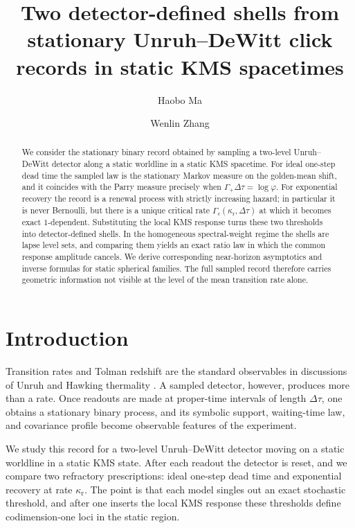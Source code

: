 \documentclass[11pt]{amsart}
\title[Detector-defined shells in static KMS spacetimes]{Two detector-defined shells from stationary Unruh--DeWitt click records in static KMS spacetimes}
\author{Haobo Ma}
\author{Wenlin Zhang}
\date{}
\numberwithin{equation}{section}
\theoremstyle{remark}
\begin{document}
\begin{abstract}
We consider the stationary binary record obtained by sampling a two-level Unruh--DeWitt detector along a static worldline in a static KMS spacetime. For ideal one-step dead time the sampled law is the stationary Markov measure on the golden-mean shift, and it coincides with the Parry measure precisely when $\Gamma_+\Delta\tau=\log\varphi$. For exponential recovery the record is a renewal process with strictly increasing hazard; in particular it is never Bernoulli, but there is a unique critical rate $\Gamma_c(\kappa_{\mathrm r},\Delta\tau)$ at which it becomes exact $1$-dependent. Substituting the local KMS response turns these two thresholds into detector-defined shells. In the homogeneous spectral-weight regime the shells are lapse level sets, and comparing them yields an exact ratio law in which the common response amplitude cancels. We derive corresponding near-horizon asymptotics and inverse formulas for static spherical families. The full sampled record therefore carries geometric information not visible at the level of the mean transition rate alone.
\end{abstract}

\maketitle

\section{Introduction}

Transition rates and Tolman redshift are the standard observables in discussions of Unruh and Hawking thermality \cite{Unruh1976,DeWitt1979,BirDav1982,LoukoSatz2006,LoukoSatz2008}. A sampled detector, however, produces more than a rate. Once readouts are made at proper-time intervals of length $\Delta\tau$, one obtains a stationary binary process, and its symbolic support, waiting-time law, and covariance profile become observable features of the experiment.

We study this record for a two-level Unruh--DeWitt detector moving on a static worldline in a static KMS state. After each readout the detector is reset, and we compare two refractory prescriptions: ideal one-step dead time and exponential recovery at rate $\kappa_{\mathrm r}$. The point is that each model singles out an exact stochastic threshold, and after one inserts the local KMS response these thresholds define codimension-one loci in the static region.
\end{document}
